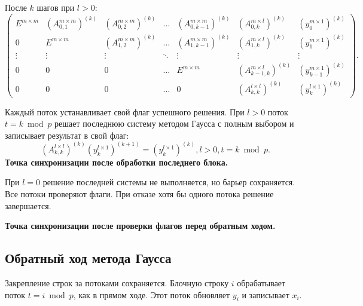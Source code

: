 \documentclass[a4paper,12pt]{article}
\newcommand{\br}[1]{\left(#1\right)}
\begin{document}
После $k$ шагов при $l > 0$:
\[
    \begin{pmatrix}
        E^{m \times m} & \br{A_{0, 1}^{m \times m}}^{(k)}     & \br{A_{0, 2}^{m \times m}}^{(k)}     & \dots  & \br{A_{0, k - 1}^{m \times m}}^{(k)}     & \br{A_{0, k}^{m \times l}}^{(k)}        & \br{y_{0}^{m \times 1}}^{(k)}     \\
        0              & E^{m \times m}                       & \br{A_{1, 2}^{m \times m}}^{(k)}     & \dots  & \br{A_{1, k - 1}^{m \times m}}^{(k)}     & \br{A_{1, k}^{m \times l}}^{(k)}        & \br{y_{1}^{m \times 1}}^{(k)}     \\
        \vdots         & \vdots                               & \vdots                               & \ddots & \vdots                                   & \vdots                                  & \vdots                            \\
        0              & 0                                    &  0                                   & \dots  & E^{m \times m}                           & \br{A_{k - 1, k}^{m \times l}}^{\br{k}} & \br{y_{k - 1}^{m \times 1}}^{(k)} \\
        0              & 0                                    &  0                                   & \dots  & 0                                        & \br{A_{k, k}^{l \times l}}^{(k)}        & \br{y_{k}^{l \times 1}}^{(k)}
    \end{pmatrix}.
\]

Каждый поток устанавливает свой флаг успешного решения. При $l > 0$ поток $t = k \bmod p$ решает последнюю систему методом Гаусса с полным выбором и записывает результат в свой флаг:
\[
    \br{A_{k,k}^{l \times l}}^{(k)} \br{y_k^{l \times 1}}^{(k + 1)}
    = \br{y_k^{l \times 1}}^{(k)},
    l > 0,t = k \bmod p.
\]
\textbf{Точка синхронизации после обработки последнего блока.}

При $l = 0$ решение последней системы не выполняется, но барьер сохраняется. Все потоки проверяют флаги. При отказе хотя бы одного потока решение завершается.

\textbf{Точка синхронизации после проверки флагов перед обратным ходом.}

\subsection{Обратный ход метода Гаусса}
Закрепление строк за потоками сохраняется. Блочную строку $i$ обрабатывает поток $t = i \bmod p$, как в прямом ходе. Этот поток обновляет $y_i$ и записывает $x_i$.
\end{document}

